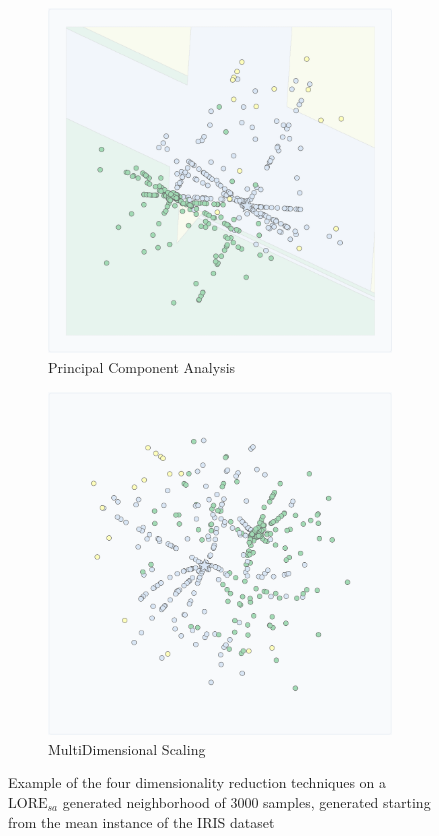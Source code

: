 \begin{figure}[!ph]
    \vspace{0.1cm} 

    \begin{subfigure}[c]{0.48\linewidth}
        \centering
        \includegraphics[width=\linewidth]{images/DR example PCA.png}
        \caption{Principal Component Analysis}
        \label{fig:DR example PCA}
    \end{subfigure}
    \hfill
    \begin{subfigure}[c]{0.48\linewidth}
        \centering
        \includegraphics[width=\linewidth]{images/DR example MDS.png}
        \caption{MultiDimensional Scaling}
        \label{fig:DR example MDS}
    \end{subfigure}
    
    \caption{Example of the four dimensionality reduction techniques on a $\text{LORE}_{sa}$ generated neighborhood of 3000 samples, generated starting from the mean instance of the IRIS dataset}
    \label{fig:Dimensionality reduction webapp example}
\end{figure}
